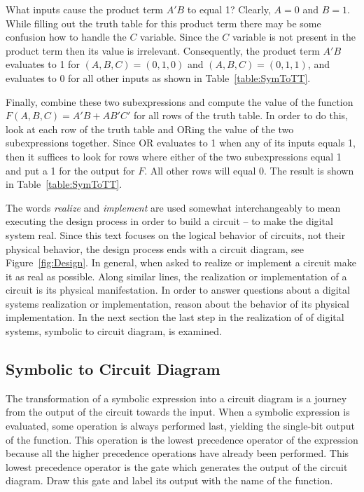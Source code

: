 What inputs cause the product term $A'B$ to equal 1?  Clearly, $A=0$ and $B=1$.
While filling out the truth table for this product term there may be some
confusion
how to handle the $C$ variable.  Since the $C$ variable is not present in the 
product term then its value is irrelevant. Consequently, the product term $A'B$
evaluates to 1 for $(A,B,C)=(0,1,0)$ and $(A,B,C)=(0,1,1)$, and evaluates to 0
for all other inputs as shown in Table~\ref{table:SymToTT}.

Finally, combine these two subexpressions and compute the value
of the function $F(A,B,C) = A'B + AB'C'$ for all rows of the truth table. In 
order to do this, look at each row of the truth table and ORing the value of 
the two
subexpressions together.  Since OR evaluates to 1 when any of its inputs equals
1, then it suffices to look for rows where either of the two subexpressions equal
1 and put a 1 for the output for $F$.  All other rows will equal 0.  The result 
is shown in Table~\ref{table:SymToTT}.

The words {\it realize} and {\it implement}   
are used somewhat interchangeably to mean executing the design
process in order to build a circuit -- to make the digital system real.  
Since this text focuses on the logical 
behavior of circuits, not their physical behavior, the design process ends with
a circuit diagram, see Figure~\ref{fig:Design}.  In general, when asked
to realize or implement a circuit make it as real as 
possible.  Along similar lines, the realization or implementation of a circuit 
is its physical manifestation.  In order to answer questions about a 
digital systems realization or implementation, reason about the behavior of its 
physical implementation.  In the next section the last step in the realization
of of digital systems, symbolic to circuit diagram, is examined.


\subsection{Symbolic to Circuit Diagram}

The transformation of a symbolic expression into a circuit diagram is a journey
from the output of the circuit towards the input.  When a symbolic expression
is evaluated, some operation is always performed last, yielding
the single-bit output of the function.  This operation is the lowest 
precedence operator of the expression because all the higher precedence 
operations have already been performed.  This lowest precedence operator
is the gate which generates the output of the circuit diagram.  Draw this gate
and label its output with the name of the function.  

